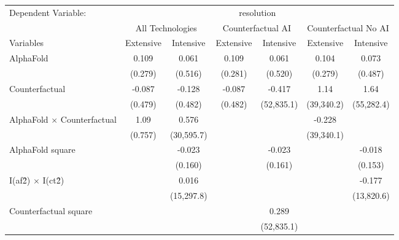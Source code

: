 \begingroup
\centering
\begin{tabular}{lcccccc}
   \tabularnewline \midrule \midrule
   Dependent Variable: & \multicolumn{6}{c}{resolution}\\
 & \multicolumn{2}{c}{All Technologies} & \multicolumn{2}{c}{Counterfactual AI} & \multicolumn{2}{c}{Counterfactual No AI} \\
\cmidrule(lr){1-1}\cmidrule(lr){2-3} \cmidrule(lr){4-5} \cmidrule(lr){6-7}
Variables & \multicolumn{1}{c}{Extensive} & \multicolumn{1}{c}{Intensive} & \multicolumn{1}{c}{Extensive} & \multicolumn{1}{c}{Intensive} & \multicolumn{1}{c}{Extensive} & \multicolumn{1}{c}{Intensive} \\
\cmidrule(lr){1-1}\cmidrule(lr){2-2} \cmidrule(lr){3-3} \cmidrule(lr){4-4} \cmidrule(lr){5-5} \cmidrule(lr){6-6} \cmidrule(lr){7-7}
   AlphaFold                          & 0.109   & 0.061      & 0.109   & 0.061      & 0.104      & 0.073\\   
                                      & (0.279) & (0.516)    & (0.281) & (0.520)    & (0.279)    & (0.487)\\   
   Counterfactual                     & -0.087  & -0.128     & -0.087  & -0.417     & 1.14       & 1.64\\   
                                      & (0.479) & (0.482)    & (0.482) & (52,835.1) & (39,340.2) & (55,282.4)\\   
   AlphaFold $\times$ Counterfactual  & 1.09    & 0.576      &         &            & -0.228     &   \\   
                                      & (0.757) & (30,595.7) &         &            & (39,340.1) &   \\   
   AlphaFold square                   &         & -0.023     &         & -0.023     &            & -0.018\\   
                                      &         & (0.160)    &         & (0.161)    &            & (0.153)\\   
   I(af\^2) $\times$ I(ct\^2)         &         & 0.016      &         &            &            & -0.177\\   
                                      &         & (15,297.8) &         &            &            & (13,820.6)\\   
   Counterfactual square              &         &            &         & 0.289      &            &   \\   
                                      &         &            &         & (52,835.1) &            &   \\   

\end{tabular}

